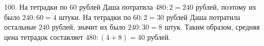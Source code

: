 100. На тетрадки по 60 рублей Даша потратила $480:2=240$ рублей, поэтому их было $240:60=4$ штуки. На тетрадки по $60:2=30$ рублей Даша потратила остальные 240 рублей, значит их было $240:30=8$ штук. Таким образом, средняя цена тетрадок составляет $480:(4+8)=40$ рублей.\\
